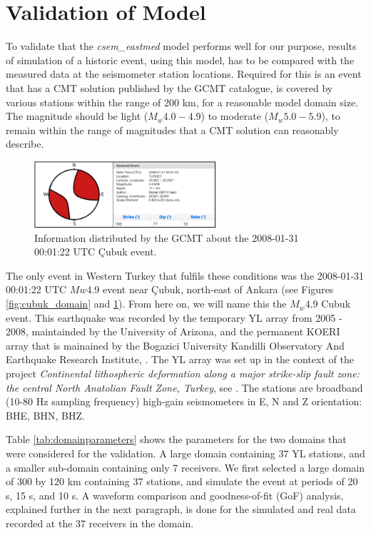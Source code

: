\documentclass[../Text/00main.tex]{subfiles}
\begin{document}
\section{Validation of Model}

To validate that the \textit{csem\_eastmed} model performs well for our purpose, results of simulation of a historic event, using this model, has to be compared with the measured data at the seismometer station locations. Required for this is an event that has a CMT solution published by the GCMT catalogue, is covered by various stations within the range of 200 km, for a reasonable model domain size. The magnitude should be light ($M_w 4.0-4.9$) to moderate ($M_w 5.0-5.9$), to remain within the range of magnitudes that a CMT solution can reasonably describe. 

\begin{figure}
    \centering
    \includegraphics[width=0.6\textwidth]{images_methods/infocubuk.png}
    \caption{Information distributed by the GCMT about the 2008-01-31 00:01:22 UTC Çubuk event.}
    \label{fig:cubukeventinfo}
\end{figure}

The only event in Western Turkey that fulfils these conditions was the 2008-01-31 00:01:22 UTC $Mw 4.9$ event near Çubuk, north-east of Ankara (see Figures \ref{fig:cubuk_domain} and \ref{fig:cubukeventinfo}). From here on, we will name this the $M_w 4.9$ Cubuk event. This earthquake was recorded by the temporary YL array from 2005 - 2008, maintainded by the University of Arizona, and the permanent KOERI array that is mainained by the Bogazici University Kandilli Observatory And Earthquake Research Institute, \citep{https://doi.org/10.7914/sn/ko}. The YL array was set up in the context of the project \textit{Continental lithospheric deformation along a major strike-slip fault zone: the central North Anatolian Fault Zone, Turkey}, see \citep{https://doi.org/10.7914/sn/yl_2005}. The stations are broadband (10-80 Hz sampling frequency) high-gain seismometers in E, N and Z orientation: BHE, BHN, BHZ.

Table \ref{tab:domainparameters} shows the parameters for the two domains that were considered for the validation. A large domain containing 37 YL stations, and a smaller sub-domain containing only 7 receivers.  We first selected a large domain of 300 by 120 km containing 37 stations, and simulate the event at periods of 20 s, 15 s, and 10 s. A waveform comparison and goodness-of-fit (GoF) analysis, explained further in the next paragraph, is done for the simulated and real data recorded at the 37 receivers in the domain. 
\end{document}
